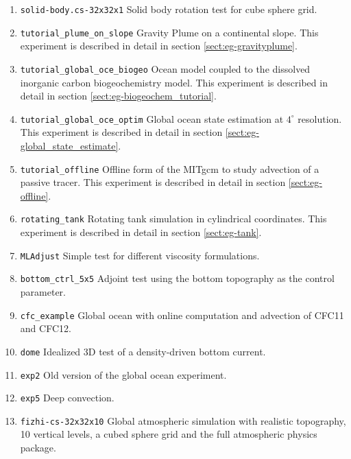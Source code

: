 \begin{enumerate}
\item \texttt{solid-body.cs-32x32x1} Solid body rotation test for cube
  sphere grid.

\item \texttt{tutorial\_plume\_on\_slope} Gravity Plume on a
  continental slope.  This experiment is described in detail in
  section \ref{sect:eg-gravityplume}.

\item \texttt{tutorial\_global\_oce\_biogeo} Ocean model coupled to
  the dissolved inorganic carbon biogeochemistry model. This
  experiment is described in detail in section
  \ref{sect:eg-biogeochem_tutorial}.

\item \texttt{tutorial\_global\_oce\_optim} Global ocean state
  estimation at $4^\circ$ resolution.  This experiment is described in
  detail in section \ref{sect:eg-global_state_estimate}.

\item \texttt{tutorial\_offline} Offline form of the MITgcm to study
  advection of a passive tracer.  This experiment is described in
  detail in section \ref{sect:eg-offline}.

\item \texttt{rotating\_tank} Rotating tank simulation in cylindrical
  coordinates.  This experiment is described in detail in section
  \ref{sect:eg-tank}.

\item \texttt{MLAdjust} Simple test for different viscosity formulations.

\item \texttt{bottom\_ctrl\_5x5} Adjoint test using the bottom
  topography as the control parameter.

\item \texttt{cfc\_example} Global ocean with online computation and
  advection of CFC11 and CFC12.

\item \texttt{dome} Idealized 3D test of a density-driven bottom current.

\item \texttt{exp2} Old version of the global ocean experiment.

\item \texttt{exp5} Deep convection.

\item \texttt{fizhi-cs-32x32x10} Global atmospheric simulation with
  realistic topography, 10 vertical levels, a cubed sphere grid and
  the full atmospheric physics package.


\end{enumerate}
